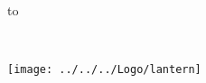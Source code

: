 \begin{titlepage}
\null\vskip-47pt
\hbox to 

\setcounter{page}{1}                      %

\vspace*{60mm}


{\selectfont
\begin{center}
 \\
\end{center}}


\begin{center}
\texttt{[image: ../../../Logo/lantern]}
\end{center}

\vfill
\end{titlepage}

\thispagestyle{empty}
\cleardoublepage

